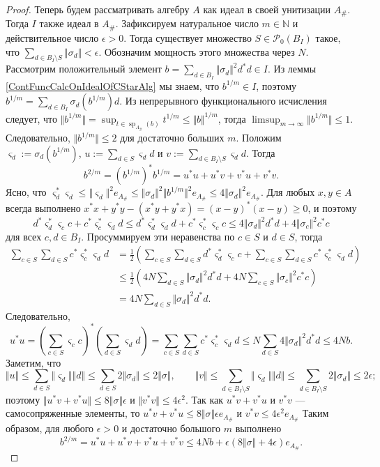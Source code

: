 \begin{proof}
Теперь будем рассматривать алгебру $A$ как идеал в своей унитизации $A_\#$. Тогда $I$ также идеал в $A_\#$. Зафиксируем натуральное число $m\in\mathbb{N}$ и действительное число $\epsilon>0$. Тогда существует множество $S\in\mathcal{P}_0(B_I)$ такое, что $\sum_{d\in B_I\setminus S}\Vert\sigma_d\Vert<\epsilon$. Обозначим мощность этого множества через $N$. Рассмотрим положительный элемент $b=\sum_{d\in B_I}\Vert\sigma_d\Vert^2 d^*d\in I$. Из леммы \ref{ContFuncCalcOnIdealOfCStarAlg} мы знаем, что $b^{1/m}\in I$, поэтому $b^{1/m}=\sum_{d\in B_I}\sigma_d(b^{1/m})d$. Из непрерывного функционального исчисления следует, что $\Vert b^{1/m}\Vert=\sup_{t\in\operatorname{sp}_{A_\#}(b)} t^{1/m}\leq\Vert b\Vert^{1/m}$, тогда $\limsup_{m\to\infty}\Vert b^{1/m}\Vert\leq 1$. Следовательно, $\Vert b^{1/m}\Vert\leq 2$ для достаточно больших $m$. Положим $\varsigma_d:=\sigma_d(b^{1/m})$, $u:=\sum_{d\in S}\varsigma_d d$ и $v:=\sum_{d\in B_I\setminus S}\varsigma_d d$. Тогда 
$$
b^{2/m}=(b^{1/m})^*b^{1/m}=u^*u+u^*v+v^*u+v^*v.
$$
Ясно, что $\varsigma_d^*\varsigma_d\leq \Vert \varsigma_d\Vert^2 e_{A_\#}\leq \Vert \sigma_d\Vert^2\Vert b^{1/m}\Vert^2 e_{A_\#}\leq 4\Vert \sigma_d\Vert^2 e_{A_\#}$. Для любых $x,y\in A$ всегда выполнено $x^*x+y^*y-(x^*y+y^*x)=(x-y)^*(x-y)\geq 0$, и поэтому 
$$
d^*\varsigma_d^* \varsigma_c c+c^*\varsigma_c^* \varsigma_d d
\leq d^*\varsigma_d^*\varsigma_d d + c^*\varsigma_c^*\varsigma_c c
\leq 4\Vert \sigma_d\Vert^2 d^*d+4\Vert \sigma_c\Vert^2 c^*c
$$
для всех $c,d\in B_I$. Просуммируем эти неравенства по $c\in S$ и $d\in S$, тогда
$$
\begin{aligned}
\sum_{c\in S}\sum_{d\in S}c^*\varsigma_c^* \varsigma_d d
&=\frac{1}{2}\left(\sum_{c\in S}\sum_{d\in S}d^*\varsigma_d^* \varsigma_c c+\sum_{c\in S}\sum_{d\in S}c^*\varsigma_c^* \varsigma_d d\right)\\
&\leq\frac{1}{2}\left(4 N\sum_{d\in S} \Vert \sigma_d\Vert^2 d^*d+
4 N\sum_{c\in S} \Vert \sigma_c\Vert^2 c^*c\right)\\
&=4 N\sum_{d\in S} \Vert \sigma_d\Vert^2 d^*d.
\end{aligned}
$$
Следовательно,
$$
u^*u
=\left(\sum_{c\in S}\varsigma_c c\right)^*\left(\sum_{d\in S}\varsigma_d d\right)
=\sum_{c\in S}\sum_{d\in S}c^*\varsigma_c^* \varsigma_d d
\leq N\sum_{d\in S} 4\Vert \sigma_d\Vert^2 d^*d
\leq 4N b.
$$
Заметим, что
$$
\Vert u\Vert
\leq \sum_{d\in S}\Vert\varsigma_d\Vert\Vert d\Vert
\leq \sum_{d\in S}2\Vert\sigma_d\Vert
\leq 2\Vert\sigma\Vert,
\qquad
\Vert v\Vert
\leq \sum_{d\in B_I\setminus S}\Vert\varsigma_d\Vert\Vert d\Vert
\leq \sum_{d\in B_I\setminus S}2\Vert\sigma_d\Vert
\leq 2\epsilon;
$$
поэтому $\Vert u^*v+v^*u\Vert\leq 8\Vert\sigma\Vert\epsilon$ и $\Vert v^*v\Vert\leq 4\epsilon^2$. Так как $u^*v+v^*u$ и $v^*v$ ---  самосопряженные элементы, то $u^*v+v^*u\leq 8\Vert\sigma\Vert\epsilon e_{A_\#}$ и $v^*v\leq 4\epsilon^2 e_{A_\#}$
Таким образом, для любого $\epsilon>0$ и достаточно большого $m$ выполнено 
$$
b^{2/m}
=u^*u+u^*v+v^*u+v^*v
\leq 4Nb+\epsilon(8\Vert\sigma\Vert+4\epsilon)e_{A_\#}.
$$


\end{proof}
